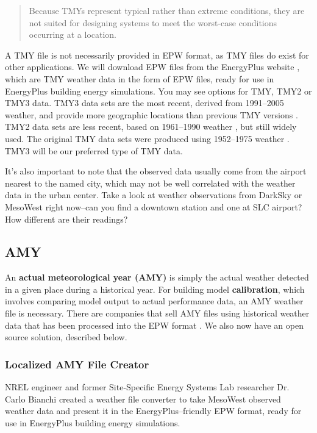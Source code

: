 \documentclass[10pt]{article}
\begin{document}
\begin{quote}
Because TMYs represent typical rather than extreme conditions, they are not suited for designing systems to meet the worst-case conditions occurring at a location. \cite{tmy-nsrdb}
\end{quote}

A TMY file is not necessarily provided in EPW format, as TMY files do exist for other applications. We will download EPW files from the EnergyPlus website \cite{EPweather}, which are TMY weather data in the form of EPW files, ready for use in EnergyPlus building energy simulations. You may see options for TMY, TMY2 or TMY3 data. TMY3 data sets are the most recent, derived from 1991--2005 weather, and provide more geographic locations than previous TMY versions \cite{TMY3user}.  TMY2 data sets are less recent, based on  1961--1990 weather \cite{TMY2user}, but still widely used.  The original TMY data sets were produced using 1952--1975 weather \cite{TMY3user}. TMY3 will be our preferred type of TMY data.

It's also important to note that the observed data usually come from the airport nearest to the named city, which may not be well correlated with the weather data in the urban center. Take a look at weather observations from DarkSky \cite{DarkSky} or MesoWest \cite{MesoWest} right now--can you find a downtown station and one at SLC airport? How different are their readings?

\subsection{AMY}

An \textbf{actual meteorological year (AMY)} is simply the actual weather detected in a given place during a historical year. For building model \textbf{calibration}, which involves comparing model output to actual performance data, an AMY weather file is necessary. There are companies that sell AMY files using historical weather data that has been processed into the EPW format \cite{noauthor_undated-vj}. We also now have an open source solution, described below.

\subsubsection{Localized AMY File Creator}

NREL engineer and former Site-Specific Energy Systems Lab researcher Dr. Carlo Bianchi created a weather file converter to take MesoWest \cite{MesoWest} observed weather data and present it in the EnergyPlus--friendly EPW format, ready for use in EnergyPlus building energy simulations.
\end{document}

